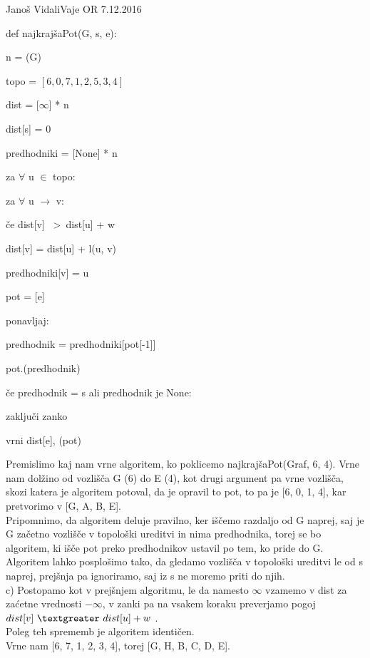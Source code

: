 \begin{naloga}{Janoš Vidali}{Vaje OR 7.12.2016}
\begin{odgovor}
\begin{algorithmic}
\item def najkrajšaPot(G, s, e): 
\item\quad n = \length(G) 
\item\quad topo = $[6, 0, 7, 1, 2, 5, 3, 4]$ 
\item\quad dist = [$\infty$] * n 
\item\quad dist[s] = 0 
\item\quad predhodniki = [None] * n \\
\item\quad za $\forall$ u $\in$ topo: 
\item\qquad za $\forall$ u $\rightarrow$ v:
\item\qquad\quad če dist[v] \ \textgreater \ dist[u] + w 
\item\qquad\qquad dist[v] = dist[u] + l(u, v)
\item\qquad\qquad predhodniki[v] = u  \\
\item\quad pot = [e] 
\item\quad ponavljaj: 
\item\qquad predhodnik = predhodniki[pot[-1]]
\item\qquad pot.\append(predhodnik)
\item\qquad če predhodnik = s ali predhodnik je None: 
\item\qquad\quad zaključi zanko \\
\item\quad vrni dist[e], \reverse(pot) \\
\end{algorithmic}

\noindent Premislimo kaj nam vrne algoritem, ko poklicemo najkrajšaPot(Graf, 6, 4).
Vrne nam dolžino od vozlišča G (6) do E (4), kot drugi argument pa vrne vozlišča, 
skozi katera je algoritem potoval, da je opravil to pot, to pa je [6, 0, 1, 4], kar pretvorimo
v [G, A, B, E]. \\

\noindent Pripomnimo, da algoritem deluje pravilno, ker iščemo razdaljo od G naprej, saj je 
G začetno vozlišče v topološki ureditvi in nima predhodnika, torej se bo algoritem, 
ki išče pot preko predhodnikov ustavil po tem, ko pride do G.
Algoritem lahko posplošimo tako, da gledamo vozlišča v topološki ureditvi le od s naprej, 
prejšnja pa ignoriramo, saj iz s ne moremo priti do njih.\\

\noindent c) Postopamo kot v prejšnjem algoritmu, le da namesto $\infty$ vzamemo v dist 
za zaćetne vrednosti $-\infty$, v zanki pa na vsakem koraku preverjamo pogoj  \\
$dist[v] \ \textgreater \ dist[u] + w$ . \\
Poleg teh sprememb je algoritem identičen.\\
Vrne nam [6, 7, 1, 2, 3, 4], torej [G, H, B, C, D, E].

\end{odgovor}
\end{naloga}
